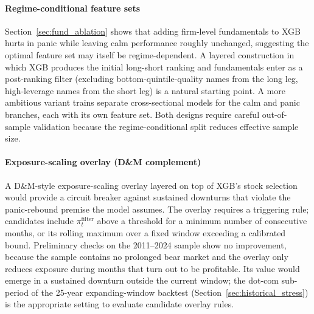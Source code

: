 \bigskip\paragraph{Regime-conditional feature sets}
Section~\ref{sec:fund_ablation} shows that adding firm-level fundamentals to XGB hurts in panic while leaving calm performance roughly unchanged, suggesting the optimal feature set may itself be regime-dependent. A layered construction in which XGB produces the initial long-short ranking and fundamentals enter as a post-ranking filter (excluding bottom-quintile-quality names from the long leg, high-leverage names from the short leg) is a natural starting point. A more ambitious variant trains separate cross-sectional models for the calm and panic branches, each with its own feature set. Both designs require careful out-of-sample validation because the regime-conditional split reduces effective sample size.

\bigskip\paragraph{Exposure-scaling overlay (D\&M complement)}
A D\&M-style exposure-scaling overlay layered on top of XGB's stock selection would provide a circuit breaker against sustained downturns that violate the panic-rebound premise the model assumes. The overlay requires a triggering rule; candidates include $\pi_t^{\text{filter}}$ above a threshold for a minimum number of consecutive months, or its rolling maximum over a fixed window exceeding a calibrated bound. Preliminary checks on the 2011--2024 sample show no improvement, because the sample contains no prolonged bear market and the overlay only reduces exposure during months that turn out to be profitable. Its value would emerge in a sustained downturn outside the current window; the dot-com sub-period of the 25-year expanding-window backtest (Section~\ref{sec:historical_stress}) is the appropriate setting to evaluate candidate overlay rules.

